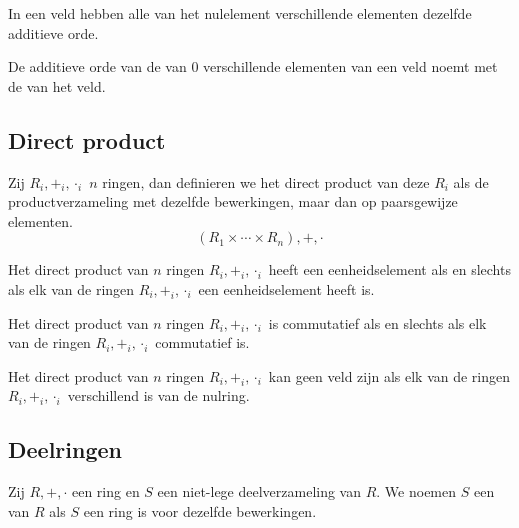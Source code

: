 \documentclass[main.tex]{subfiles}
\begin{document}
\begin{st}
  In een veld hebben alle van het nulelement verschillende elementen dezelfde additieve orde.
\end{st}

\begin{de}
  De additieve orde van de van $0$ verschillende elementen van een veld noemt met de  van het veld.
\end{de}


\subsection{Direct product}
\label{sec:direct-product}


\begin{de}
  Zij $R_{i},+_{i},\cdot_{i}$ $n$ ringen, dan definieren we het direct product van deze $R_{i}$ als de productverzameling met dezelfde bewerkingen, maar dan op paarsgewijze elementen.
  \[ (R_{1} \times \dotsb \times R_{n}),+,\cdot \]
\end{de}

\begin{st}
  Het direct product van $n$ ringen $R_{i},+_{i},\cdot_{i}$ heeft een eenheidselement als en slechts als elk van de ringen $R_{i},+_{i},\cdot_{i}$ een eenheidselement heeft is.
\end{st}

\begin{st}
  Het direct product van $n$ ringen $R_{i},+_{i},\cdot_{i}$ is commutatief als en slechts als elk van de ringen $R_{i},+_{i},\cdot_{i}$ commutatief is.
\end{st}

\begin{st}
  Het direct product van $n$ ringen $R_{i},+_{i},\cdot_{i}$ kan geen veld zijn als elk van de ringen $R_{i},+_{i},\cdot_{i}$ verschillend is van de nulring.
\end{st}

\subsection{Deelringen}
\label{sec:deelringen}

\begin{de}
  Zij $R,+,\cdot$ een ring en $S$ een niet-lege deelverzameling van $R$.
  We noemen $S$ een  van $R$ als $S$ een ring is voor dezelfde bewerkingen.
\end{de}
\end{document}

